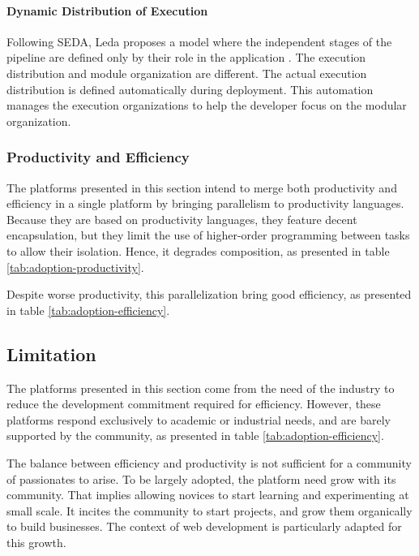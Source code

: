 \paragraph{Dynamic Distribution of Execution}

Following SEDA, Leda proposes a model where the independent stages of the pipeline are defined only by their role in the application \cite{Salmito2013,Salmito2014}.
The execution distribution and module organization are different.
The actual execution distribution is defined automatically during deployment.
This automation manages the execution organizations to help the developer focus on the modular organization.

\subsubsection{Productivity and Efficiency}

The platforms presented in this section intend to merge both productivity and efficiency in a single platform by bringing parallelism to productivity languages.
Because they are based on productivity languages, they feature decent encapsulation, but they limit the use of higher-order programming between tasks to allow their isolation.
Hence, it degrades composition, as presented in table \ref{tab:adoption-productivity}.

Despite worse productivity, this parallelization bring good efficiency, as presented in table \ref{tab:adoption-efficiency}.


\subsection{Limitation}

The platforms presented in this section come from the need of the industry to reduce the development commitment required for efficiency.
However, these platforms respond exclusively to academic or industrial needs, and are barely supported by the community, as presented in table \ref{tab:adoption-efficiency}.

The balance between efficiency and productivity is not sufficient for a community of passionates to arise.
To be largely adopted, the platform need grow with its community.
That implies allowing novices to start learning and experimenting at small scale.
It incites the community to start projects, and grow them organically to build businesses.
The context of web development is particularly adapted for this growth.

